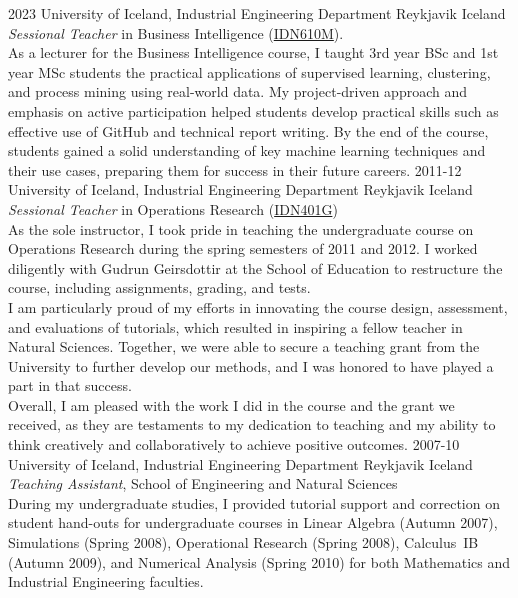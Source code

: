 \begin{entrylist}
\entry
{2023}
{University of Iceland, Industrial Engineering Department}
{Reykjavik Iceland}
{\emph{Sessional Teacher} in Business Intelligence (\href{https://ugla.hi.is/kennsluskra/index.php?tab=nam&chapter=namskeid&id=71001420230}{IDN610M}). \\
As a lecturer for the Business Intelligence course, I taught 3rd year BSc and 1st year MSc students the practical applications of supervised learning, clustering, and process mining using real-world data. My project-driven approach and emphasis on active participation helped students develop practical skills such as effective use of GitHub and technical report writing. By the end of the course, students gained a solid understanding of key machine learning techniques and their use cases, preparing them for success in their future careers.
}
\entry
{2011-12}
{University of Iceland, Industrial Engineering Department}
{Reykjavik Iceland}
{\emph{Sessional Teacher} in Operations Research (\href{https://ugla.hi.is/kennsluskra/index.php?sid=&tab=nam&chapter=namskeid&id=08213020110}{IDN401G})\\
As the sole instructor, I took pride in teaching the undergraduate course on Operations Research during the spring semesters of 2011 and 2012. I worked diligently with Gudrun Geirsdottir at the School of Education to restructure the course, including assignments, grading, and tests.\\
I am particularly proud of my efforts in innovating the course design, assessment, and evaluations of tutorials, which resulted in inspiring a fellow teacher in Natural Sciences. Together, we were able to secure a teaching grant from the University to further develop our methods, and I was honored to have played a part in that success.\\
Overall, I am pleased with the work I did in the course and the grant we received, as they are testaments to my dedication to teaching and my ability to think creatively and collaboratively to achieve positive outcomes.
}	
\entry
{2007-10}
{University of Iceland, Industrial Engineering Department}
{Reykjavik Iceland}
{\emph{Teaching Assistant}, School of Engineering and Natural Sciences \\
During my undergraduate studies, I provided tutorial support and correction on student hand-outs for undergraduate courses in Linear Algebra (Autumn 2007), Simulations (Spring 2008), Operational Research (Spring 2008), Calculus~IB (Autumn 2009), and Numerical Analysis (Spring 2010) for both Mathematics and Industrial Engineering faculties.}
\end{entrylist}   
